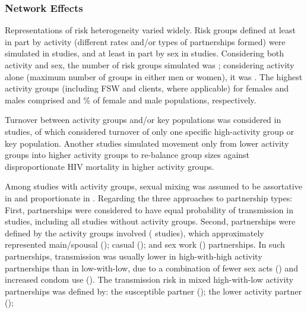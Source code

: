 \subsubsection{Network Effects}
\label{sss:res:network}
Representations of risk heterogeneity varied widely.
Risk groups defined at least in part by activity
(different rates and/or types of partnerships formed) were simulated in  studies,  %
and at least in part by sex in  studies.
Considering both activity and sex, the number of risk groups simulated was ;  %
considering activity alone (maximum number of groups in either men or women), it was .
The highest activity groups (including FSW and clients, where applicable) for females and males comprised
 and  \% of female and male populations, respectively.
\par
Turnover between activity groups and/or key populations %
was considered in  studies,
of which  considered turnover of only
one specific high-activity group or key population.
Another  studies simulated
movement only from lower activity groups into higher activity groups
to re-balance group sizes against disproportionate HIV mortality in higher activity groups.
\par
Among  studies with activity groups, sexual mixing was assumed to be
assortative in  and proportionate in .  %
Regarding the three approaches to partnership types:
First, partnerships were considered to have equal probability of transmission in
 studies, including all studies without activity groups.
Second, partnerships were defined by the activity groups involved ( studies),
which approximately represented
main/spousal ();
casual (); and
sex work () partnerships.
In such partnerships, transmission was usually
lower in high-with-high activity partnerships than in low-with-low, due to a combination of
fewer sex acts () and
increased condom use ().
The transmission risk in mixed high-with-low activity partnerships was defined by:
the susceptible partner ();
the lower activity partner ();
